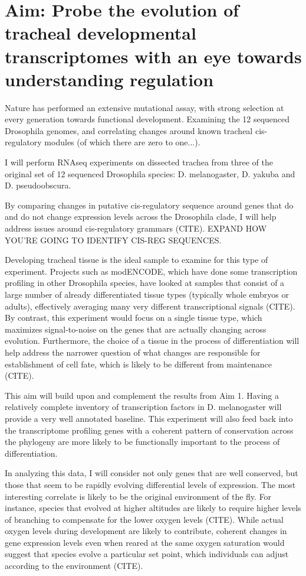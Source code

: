 \documentclass{proposal}
\begin{document}
\section{Aim: Probe the evolution of tracheal developmental transcriptomes with an eye towards understanding regulation}
Nature has performed an extensive mutational assay, with strong selection at every generation towards functional development.
Examining the 12 sequenced Drosophila genomes, and correlating changes around known tracheal cis-regulatory modules (of which there are zero to one...).

I will perform RNAseq experiments on dissected trachea from three of the original set of 12 sequenced Drosophila species: D. melanogaster, D. yakuba and D. pseudoobscura.

By comparing changes in putative cis-regulatory sequence around genes that do and do not change expression levels across the Drosophila clade, I will help address issues around cis-regulatory grammars (CITE). EXPAND HOW YOU'RE GOING TO IDENTIFY CIS-REG SEQUENCES.

Developing tracheal tissue is the ideal sample to examine for this type of experiment.
Projects such as modENCODE, which have done some transcription profiling in other Drosophila species, have looked at samples that consist of a large number of already differentiated tissue types (typically whole embryos or adults), effectively averaging many very different transcriptional signals (CITE).
By contrast, this experiment would focus on a single tissue type, which maximizes signal-to-noise on the genes that are actually changing across evolution.
Furthermore, the choice of a tissue in the process of differentiation will help address the narrower question of what changes are responsible for establishment of cell fate, which is likely to be different from maintenance (CITE). 

This aim will build upon and complement the results from Aim 1.
Having a relatively complete inventory of transcription factors in D.  melanogaster will provide a very well annotated baseline.
This experiment will also feed back into the transcriptome profiling genes with a coherent pattern of conservation across the phylogeny are more likely to be functionally important to the process of differentiation.

In analyzing this data, I will consider not only genes that are well conserved, but those that seem to be rapidly evolving differential levels of expression.
The most interesting correlate is likely to be the original environment of the fly.
For instance, species that evolved at higher altitudes are likely to require higher levels of branching to compensate for the lower oxygen levels (CITE).
While actual oxygen levels during development are likely to contribute, coherent changes in gene expression levels even when reared at the same oxygen saturation would suggest that species evolve a particular set point, which individuals can adjust according to the environment (CITE).
\end{document}
